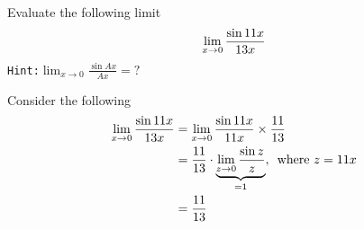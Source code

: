 



\question Evaluate the following limit \[ \lim_{x\to 0}\dfrac{\sin11 x}{13 x}\]
\texttt{Hint:}$\lim_{x\to 0}\frac{\sin Ax}{Ax} = ?$

\watchout[-40pt]

\begin{solution}
  Consider the following
  \begin{align}
    \lim_{x\to 0}\dfrac{\sin11 x}{13 x} &= \lim_{x\to 0}\dfrac{\sin11 x}{11 x}\times\dfrac{11}{13} \\
    &= \dfrac{11}{13}\cdot
    \underbrace{\lim_{z\to 0}\dfrac{\sin z}{z}}_{=1},\,\text{ where } z = 11 x \\
    &= \dfrac{11}{13}
  \end{align}
\end{solution}

